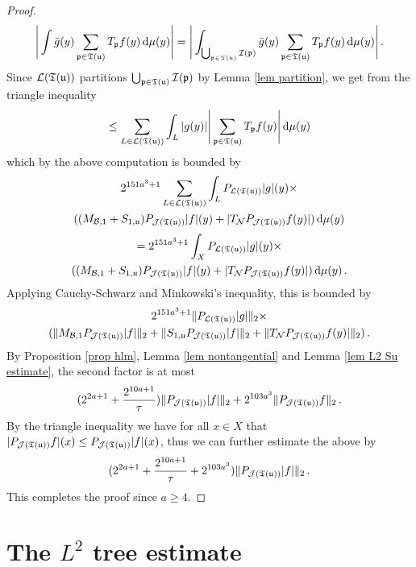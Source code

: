 \begin{proof}
    $$
        \Bigg| \int \bar g(y) \sum_{\mathfrak p \in \mathfrak T(\mathfrak u)} T_{\mathfrak p} f(y)  \, \mathrm{d}\mu(y) \Bigg| = \Bigg| \int_{\bigcup_{\mathfrak p \in \mathfrak T(\mathfrak u)} \mathcal{I}(\mathfrak p)} \bar g(y) \sum_{\mathfrak p \in \mathfrak T(\mathfrak u)} T_{\mathfrak p} f(y)  \, \mathrm{d}\mu(y) \Bigg|\,.
    $$
    Since $\mathcal{L}(\mathfrak T(\mathfrak u))$ partitions $\bigcup_{\mathfrak p \in \mathfrak T(\mathfrak u)} \mathcal{I}(\mathfrak p)$ by Lemma \ref{lem partition},
    we get from the triangle inequality
    $$
        \le \sum_{L \in \mathcal{L}(\mathfrak T(\mathfrak u))} \int_L |g(y)| \Bigg| \sum_{\mathfrak p \in \mathfrak T(\mathfrak u)} T_{\mathfrak p} f(y) \Bigg| \, \mathrm{d}\mu(y)
    $$
    which by the above computation is bounded by
    \begin{multline*}
        2^{151a^3 + 1} \sum_{L \in \mathcal{L}(\mathfrak T(\mathfrak u))} \int_L P_{\mathcal{L}(\mathfrak T(\mathfrak u))}|g|(y) \times \\((M_{\mathcal{B},1}+S_{1,\mathfrak u})P_{\mathcal{J}(\mathfrak T(\mathfrak u))}|f|(y)+|T_{\mathcal{N}}P_{\mathcal{J}(\mathfrak T(\mathfrak u))}f(y)| ) \, \mathrm{d}\mu(y)
    \end{multline*}
    \begin{multline*}
        = 2^{151a^3 + 1} \int_X P_{\mathcal{L}(\mathfrak T(\mathfrak u))}|g|(y)\times \\((M_{\mathcal{B},1}+S_{1,\mathfrak u})P_{\mathcal{J}(\mathfrak T(\mathfrak u))}|f|(y)+|T_{\mathcal{N}}P_{\mathcal{J}(\mathfrak T(\mathfrak u))}f(y)| ) \, \mathrm{d}\mu(y)\,.
    \end{multline*}
    Applying Cauchy-Schwarz and Minkowski's inequality, this is bounded by
    \begin{multline*}
        2^{151a^3 + 1} \|P_{\mathcal{L}(\mathfrak T(\mathfrak u))}|g|\|_2 \times \\(\|M_{\mathcal{B},1}P_{\mathcal{J}(\mathfrak T(\mathfrak u))}|f|\|_2 + \|S_{1,\mathfrak u}P_{\mathcal{J}(\mathfrak T(\mathfrak u))}|f|\|_2 + \|T_{\mathcal{N}}P_{\mathcal{J}(\mathfrak T(\mathfrak u))}f(y)|\|_2)\,.
    \end{multline*}
    By Proposition \ref{prop hlm}, Lemma \ref{lem nontangential} and Lemma \ref{lem L2 Su estimate}, the second factor is at most
    $$
        (2^{2a+1} + \frac{2^{10a + 1}}{\tau})\|P_{\mathcal{J}(\mathfrak T(\mathfrak u))}|f|\|_2 + 2^{103a^3} \|P_{\mathcal{J}(\mathfrak T(\mathfrak u))}f\|_2\,.
    $$
    By the triangle inequality we have for all $x \in X$ that $|P_{\mathcal{J}(\mathfrak T(\mathfrak u))}f|(x) \le P_{\mathcal{J}(\mathfrak T(\mathfrak u))}|f|(x)$, thus we can further estimate the above by
    $$
        (2^{2a+1} + \frac{2^{10a + 1}}{\tau} + 2^{103a^3}) \|P_{\mathcal{J}(\mathfrak T(\mathfrak u))}|f|\|_2\,.
    $$
    This completes the proof since $a \ge 4$.
\end{proof}

\section{The \texorpdfstring{$L^2$}{L2} tree estimate}

